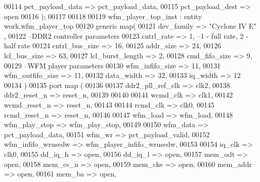 \begin{DoxyCode}
00114         pct_payload_data        => pct_payload_data,
00115         pct_payload_dest        => \textcolor{keywordflow}{open}
00116         \textcolor{vhdlchar}{)};
00117 
00118 
00119 wfm\_player\_top\_inst : \textcolor{keywordflow}{entity} work.wfm_player_top
00120     \textcolor{keywordflow}{generic} \textcolor{keywordflow}{map}(
00121             dev_family          => \textcolor{keyword}{"Cyclone IV E"}  , 
00122 \textcolor{keyword}{            --DDR2 controller parameters}
00123             cntrl_rate          => \textcolor{vhdllogic}{1},\textcolor{keyword}{ --1 - full rate, 2 - half rate}
00124             cntrl_bus_size      => \textcolor{vhdllogic}{16},
00125             addr_size           => \textcolor{vhdllogic}{24},
00126             lcl_bus_size        => \textcolor{vhdllogic}{63},
00127             lcl_burst_length    => \textcolor{vhdllogic}{2},
00128             cmd_fifo_size       => \textcolor{vhdllogic}{9},
00129 \textcolor{keyword}{            --WFM player parameters}
00130             wfm_infifo_size => \textcolor{vhdllogic}{11},
00131             wfm_outfifo_size    => \textcolor{vhdllogic}{11}, 
00132             data_width          => \textcolor{vhdllogic}{32},
00133             iq_width                => \textcolor{vhdllogic}{12}
00134 \textcolor{vhdlchar}{)}
00135   \textcolor{keywordflow}{port} \textcolor{keywordflow}{map} (
00136 
00137         ddr2_pll_ref_clk        => clk2,
00138         ddr2\_reset\_n            => reset_n,
00139 
00140 
00141         wcmd_clk                    => clk1,
00142         wcmd\_reset\_n            => reset_n,
00143         
00144         rcmd_clk                    => clk0,
00145         rcmd\_reset\_n            => reset_n,
00146 
00147         wfm_load                    => wfm_load,
00148         wfm_play_stop           => wfm_play_stop,
00149 
00150         wfm_data                    => pct_payload_data,
00151         wfm_wr                  => pct_payload_valid,
00152         wfm_infifo_wrusedw  => wfm\_player\_infifo\_wrusedw,
00153 
00154         iq_clk                  => clk0, 
00155         dd_iq_h                 => \textcolor{keywordflow}{open},
00156         dd_iq_l                 => \textcolor{keywordflow}{open},
00157         mem_odt                 => \textcolor{keywordflow}{open},
00158         mem_cs_n                    => \textcolor{keywordflow}{open},
00159         mem_cke                 => \textcolor{keywordflow}{open},
00160         mem_addr                    => \textcolor{keywordflow}{open},
00161         mem_ba                  => \textcolor{keywordflow}{open},

\end{DoxyCode}
